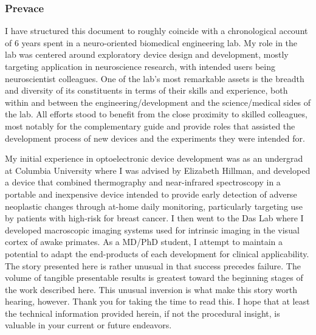 \hypertarget{preface}{%
	\subsubsection*{
		Prevace}\label{preface}}  

I have structured this document to roughly coincide with a chronological account of 6 years spent in a neuro-oriented biomedical engineering lab.
My role in the lab was centered around exploratory device design and development, mostly targeting application in neuroscience research, with intended users being neuroscientist colleagues.
One of the lab's most remarkable assets is the breadth and diversity of its constituents in terms of their skills and experience, both within and between the engineering/development and the science/medical sides of the lab.
All efforts stood to benefit from the close proximity to skilled colleagues, most notably for the complementary guide and provide roles that assisted the development process of new devices and the experiments they were intended for.

My initial experience in optoelectronic device development was as an undergrad at Columbia University where I was advised by Elizabeth Hillman, and developed a device that combined thermography and near-infrared spectroscopy in a portable and inexpensive device intended to provide early detection of adverse neoplastic changes through at-home daily monitoring, particularly targeting use by patients with high-risk for breast cancer.
I then went to the Das Lab where I developed macroscopic imaging systems used for intrinsic imaging in the visual cortex of awake primates.
As a MD/PhD student, I attempt to maintain a potential to adapt the end-products of each development for clinical applicability.
The story presented here is rather unusual in that success precedes failure.
The volume of tangible presentable results is greatest toward the beginning stages of the work described here.
This unusual inversion is what make this story worth hearing, however.
Thank you for taking the time to read this.
I hope that at least the technical information provided herein, if not the procedural insight, is valuable in your current or future endeavors.
